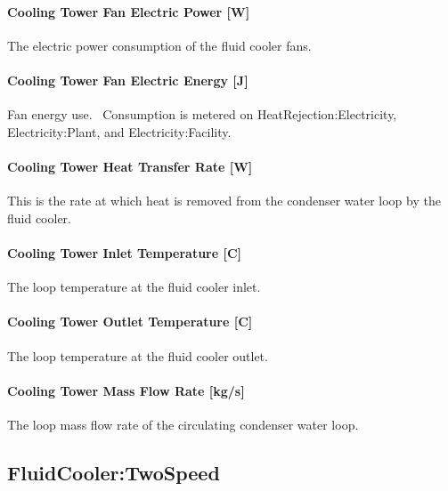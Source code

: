 \paragraph{Cooling Tower Fan Electric Power {[}W{]}}\label{cooling-tower-fan-electric-power-w-6}

The electric power consumption of the fluid cooler fans.

\paragraph{Cooling Tower Fan Electric Energy {[}J{]}}\label{cooling-tower-fan-electric-energy-j-6}

Fan energy use.~ Consumption is metered on HeatRejection:Electricity, Electricity:Plant, and Electricity:Facility.

\paragraph{Cooling Tower Heat Transfer Rate {[}W{]}}\label{cooling-tower-heat-transfer-rate-w-6}

This is the rate at which heat is removed from the condenser water loop by the fluid cooler.

\paragraph{Cooling Tower Inlet Temperature {[}C{]}}\label{cooling-tower-inlet-temperature-c-6}

The loop temperature at the fluid cooler inlet.

\paragraph{Cooling Tower Outlet Temperature {[}C{]}}\label{cooling-tower-outlet-temperature-c-6}

The loop temperature at the fluid cooler outlet.

\paragraph{Cooling Tower Mass Flow Rate {[}kg/s{]}}\label{cooling-tower-mass-flow-rate-kgs-6}

The loop mass flow rate of the circulating condenser water loop.

\subsection{FluidCooler:TwoSpeed}\label{fluidcoolertwospeed}

